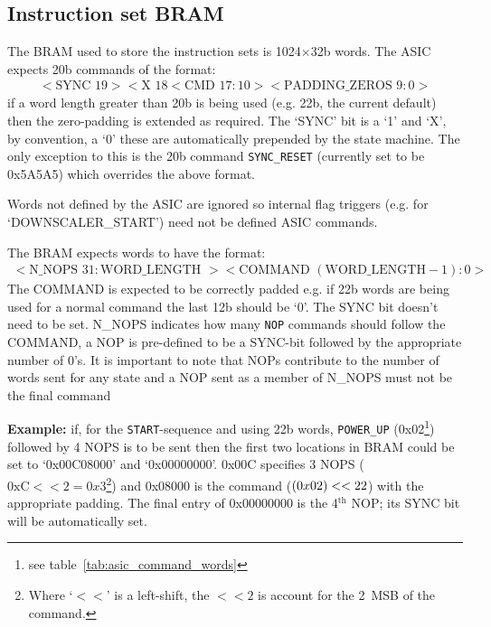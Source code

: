     \subsection{Instruction set BRAM} %
    \label{sub:tx_bram}
    The BRAM used to store the instruction sets is 1024\(\times\)32b words. The ASIC expects 20b commands of the format:
    \begin{align}\label{fmt:asic_format}
        <\text{SYNC }19><\text{X }18<\text{CMD } 17:10><\text{PADDING\_ZEROS } 9:0>
    \end{align}
    if a word length greater than 20b is being used (e.g. 22b, the current default) then the zero-padding is extended as required. The `SYNC' bit is a `1' and `X', by convention, a `0' these are automatically prepended by the state machine. The only exception to this is the 20b command \texttt{SYNC\_RESET} (currently set to be 0x5A5A5) which overrides the above format.

    Words not defined by the ASIC are ignored so internal flag triggers (e.g. for `DOWNSCALER\_START') need not be defined ASIC commands.

    The BRAM expects words to have the format:
    \begin{align}\label{fmt:tx_bram}
        <\text{N\_NOPS } 31:\text{WORD\_LENGTH }><\text{COMMAND } (\text{WORD\_LENGTH} - 1):0>
    \end{align}
    The COMMAND is expected to be correctly padded e.g. if 22b words are being used for a normal command the last 12b should be `0'. The SYNC bit doesn't need to be set. N\_NOPS indicates how many \texttt{NOP} commands should follow the COMMAND, a NOP is pre-defined to be a SYNC-bit followed by the appropriate number of 0's. It is important to note that NOPs contribute to the number of words sent for any state and a NOP sent as a member of N\_NOPS must not be the final command

    \textbf{Example:} if, for the \texttt{START}-sequence and using 22b words, \texttt{POWER\_UP} (0x02\footnote{see table~\ref{tab:asic_command_words}}) followed by 4 NOPS is to be sent then the first two locations in BRAM could be set to `0x00C08000' and `0x00000000'. 0x00C specifies 3 NOPS (\(\text{0xC}<<2 = 0x3\)\footnote{Where `\(<<\)' is a left-shift, the \( <<2 \) is account for the 2~MSB of the command.}) and 0x08000 is the command (\(\text(0x02) << 22 \)) with the appropriate padding. The final entry of 0x00000000 is the 4\(^{\text{th}}\) NOP; its SYNC bit will be automatically set.
